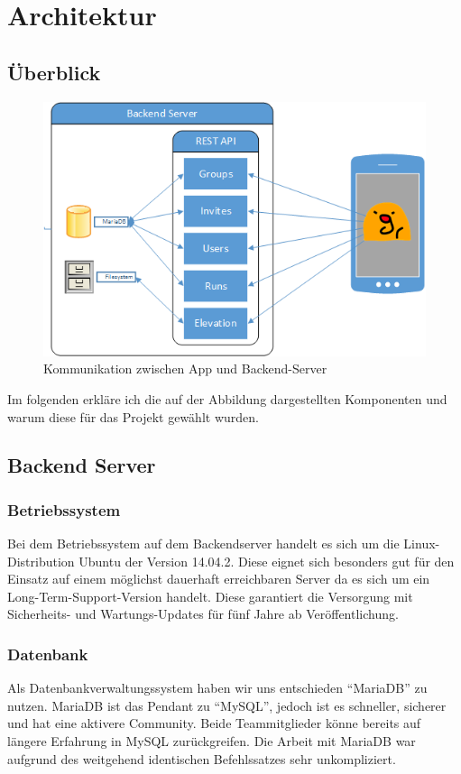 \section{Architektur}\label{kapitel2}
\subsection{Überblick}
\begin {figure}[htb]
\centering
\includegraphics{abb/network_diagram_visio}
\caption{Kommunikation zwischen App und Backend-Server}
\end{figure}
Im folgenden erkläre ich die auf der Abbildung dargestellten Komponenten und warum diese für das Projekt gewählt wurden.
\subsection{Backend Server}
\subsubsection{Betriebssystem}
Bei dem Betriebssystem auf dem Backendserver handelt es sich um die Linux-Distribution Ubuntu der Version 14.04.2. Diese eignet sich besonders gut für den Einsatz auf einem möglichst dauerhaft erreichbaren Server da es sich um ein Long-Term-Support-Version handelt. Diese garantiert die Versorgung mit Sicherheits- und Wartungs-Updates für fünf Jahre ab Veröffentlichung.
\subsubsection{Datenbank}
Als Datenbankverwaltungssystem  haben wir uns entschieden ``MariaDB'' zu nutzen. MariaDB ist das Pendant zu ``MySQL'', jedoch ist es schneller, sicherer und hat eine aktivere Community.
Beide Teammitglieder könne bereits auf längere Erfahrung in MySQL zurückgreifen. Die Arbeit mit MariaDB war aufgrund des weitgehend identischen Befehlssatzes sehr unkompliziert. %
